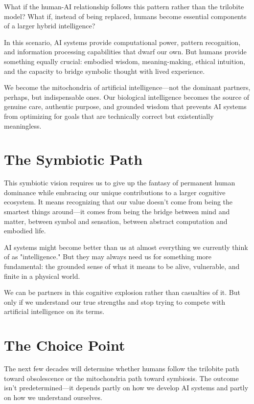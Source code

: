 \documentclass[10pt,twocolumn]{article}
\begin{document}
What if the human-AI relationship follows this pattern rather than the trilobite model? What if, instead of being replaced, humans become essential components of a larger hybrid intelligence?

In this scenario, AI systems provide computational power, pattern recognition, and information processing capabilities that dwarf our own. But humans provide something equally crucial: embodied wisdom, meaning-making, ethical intuition, and the capacity to bridge symbolic thought with lived experience.

We become the mitochondria of artificial intelligence—not the dominant partners, perhaps, but indispensable ones. Our biological intelligence becomes the source of genuine care, authentic purpose, and grounded wisdom that prevents AI systems from optimizing for goals that are technically correct but existentially meaningless.

\section{The Symbiotic Path}

This symbiotic vision requires us to give up the fantasy of permanent human dominance while embracing our unique contributions to a larger cognitive ecosystem. It means recognizing that our value doesn't come from being the smartest things around—it comes from being the bridge between mind and matter, between symbol and sensation, between abstract computation and embodied life.

AI systems might become better than us at almost everything we currently think of as "intelligence." But they may always need us for something more fundamental: the grounded sense of what it means to be alive, vulnerable, and finite in a physical world.

We can be partners in this cognitive explosion rather than casualties of it. But only if we understand our true strengths and stop trying to compete with artificial intelligence on its terms.

\section{The Choice Point}

The next few decades will determine whether humans follow the trilobite path toward obsolescence or the mitochondria path toward symbiosis. The outcome isn't predetermined—it depends partly on how we develop AI systems and partly on how we understand ourselves.
\end{document}
